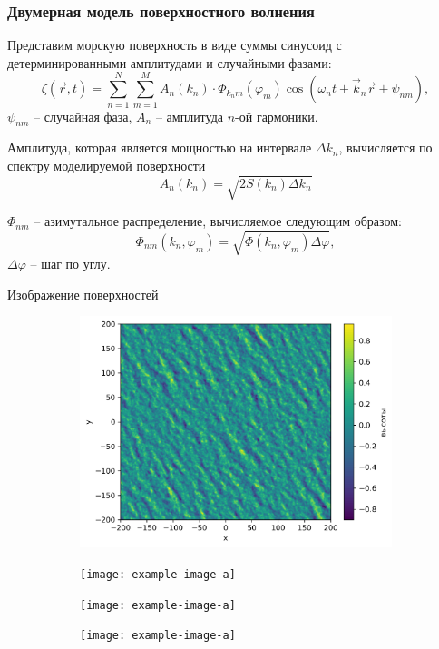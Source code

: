 \documentclass[10pt,pdf,hyperref={unicode}, dvipsnames]{beamer}
\renewcommand{\phi}{\varphi}
\begin{document}
\begin{frame}[t]

	\frametitle{Двумерная модель поверхностного волнения}
	Представим морскую поверхность в виде суммы синусоид с детерминированными амплитудами и случайными фазами:
\begin{equation}
	\zeta(\vec r, t)= \sum\limits_{n=1}^N \sum_{m=1}^M A_n(k_n)\cdot 
		\Phi_{k_nm}(\phi_m) \cos(\omega_n t + \vec k_n \vec r + \psi_{nm}),
\end{equation}
$\psi_{nm}$ -- случайная фаза, $A_n$ -- амплитуда $n$-ой гармоники.

Амплитуда, которая является мощностью на интервале $\Delta k_n$, вычисляется по спектру моделируемой поверхности
\begin{equation}
	A_n(k_n)=\sqrt{2 S(k_n) \Delta k_n}
\end{equation}

$\Phi_{nm}$ -- азимутальное распределение, вычисляемое следующим образом:
\begin{equation}
	\Phi_{nm}(k_n,\phi_m)=\sqrt{\Phi(k_n,\phi_m) \Delta \phi},
\end{equation}
$\Delta \phi$ -- шаг по углу.

\end{frame}
\begin{frame}[t]{Изображение поверхностей}
    \begin{figure}[h]
        \begin{subfigure}{0.49\linewidth}
            \centering
            \includegraphics[width=1\linewidth]{img/heights5.png}
        \end{subfigure}
        \begin{subfigure}{0.49\linewidth}
            \centering
            \texttt{[image: example-image-a]}
        \end{subfigure}
        \begin{subfigure}{0.49\linewidth}
            \centering
            \texttt{[image: example-image-a]}
        \end{subfigure}
        \begin{subfigure}{0.49\linewidth}
            \centering
            \texttt{[image: example-image-a]}
        \end{subfigure}
    \end{figure}    
\end{frame}
\end{document}
